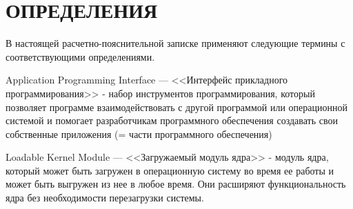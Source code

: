 \chapter*{ОПРЕДЕЛЕНИЯ}

В настоящей расчетно-пояснительной записке применяют следующие термины с соответствующими определениями.

\begin{description}[leftmargin=0pt]
	\item \noindent Application Programming Interface --- <<Интерфейс прикладного программирования>> -
	набор инструментов программирования,
		который позволяет программе взаимодействовать с другой программой или операционной системой
		и помогает разработчикам программного обеспечения создавать свои собственные приложения
		(= части программного обеспечения)\cite{API-definition}
	\item \noindent Loadable Kernel Module --- <<Загружаемый модуль ядра>> -
		модуль ядра, который может быть загружен в операционную систему во время ее работы
		и может быть выгружен из нее в любое время.
		Они расширяют функциональность ядра без необходимости перезагрузки системы.\cite{LKM-definition}
\end{description}
